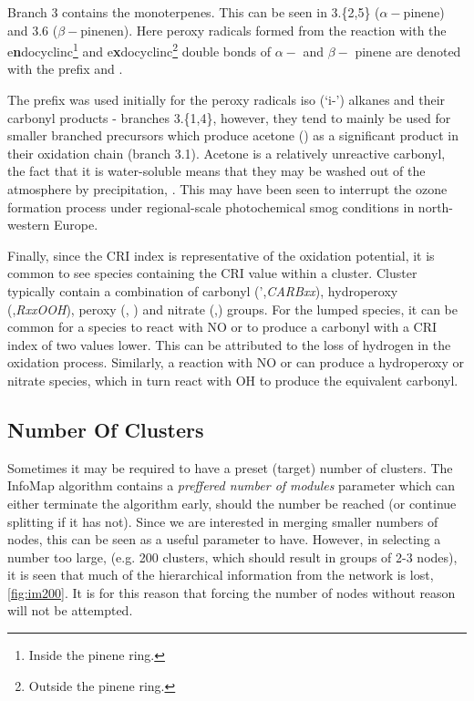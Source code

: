 Branch 3 contains the monoterpenes. This can be seen in 3.\{2,5\} ($\alpha-$pinene) and 3.6 ($\beta-$pinenen). Here peroxy radicals formed from the reaction with the e\textbf{n}docyclinc\footnote{Inside the pinene ring.} and e\textbf{x}docyclinc\footnote{Outside the pinene ring.} double bonds of $\alpha-$ and $\beta-$ pinene are denoted with the prefix \emph{} and \emph{}.

The \emph{} prefix was used initially for the peroxy radicals iso (`i-') alkanes and their carbonyl products - branches 3.\{1,4\}, however, they tend to mainly be used for smaller branched precursors which produce acetone () as a significant product in their oxidation chain (branch 3.1). Acetone is a relatively unreactive carbonyl, the fact that it is water-soluble means that they may be washed out of the atmosphere by precipitation, \citep{acetonerain}. This may have been seen to interrupt the ozone formation process under regional-scale photochemical smog conditions in north-western Europe.

Finally, since the CRI index is representative of the oxidation potential, it is common to see species containing the CRI value within a cluster. Cluster typically contain a combination of carbonyl (',\emph{CARBxx}), hydroperoxy (,\emph{RxxOOH}), peroxy (, \emph{}) and nitrate (,\emph{}) groups. For the lumped species, it can be common for a  species to react with NO or  to produce a carbonyl with a CRI index of two values lower. This can be attributed to the loss of hydrogen in the oxidation process. Similarly, a reaction with NO or  can produce a hydroperoxy or nitrate species, which in turn react with OH to produce the equivalent carbonyl.
%
%
%
%
%



 \subsection{Number Of Clusters}
Sometimes it may be required to have a preset (target) number of clusters. The InfoMap algorithm contains a \emph{preffered number of modules} parameter which can either terminate the algorithm early, should the number be reached (or continue splitting if it has not). Since we are interested in merging smaller numbers of nodes, this can be seen as a useful parameter to have. However, in selecting a number too large, (e.g. 200 clusters, which should result in groups of 2-3 nodes), it is seen that much of the hierarchical information from the network is lost, \autoref{fig:im200}. It is for this reason that forcing the number of nodes without reason will not be attempted.


